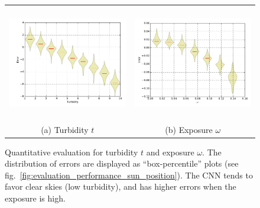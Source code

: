 \begin{figure}[!th]
    \centering
    \footnotesize
    \setlength{\tabcolsep}{1pt}
    \begin{tabular}{cc}
    \includegraphics[height=5cm]{figures/evaluation_performances/dist-turdibity.pdf} &
    \includegraphics[height=5cm]{./figures/evaluation_performances/dist-omega.pdf} \\
    (a) Turbidity $t$ &
    (b) Exposure $\omega$ 
    \end{tabular}
    \vspace{.25em}
    \caption[Quantitative evaluation for turbidity $t$ and exposure $\omega$]{Quantitative evaluation for turbidity $t$ and exposure $\omega$. The distribution of errors are displayed as ``box-percentile'' plots (see fig.~\ref{fig:evaluation_performance_sun_position}). The CNN tends to favor clear skies (low turbidity), and has higher errors when the exposure is high.}
    \label{fig:evaluation_sky_parameters}
\end{figure}

